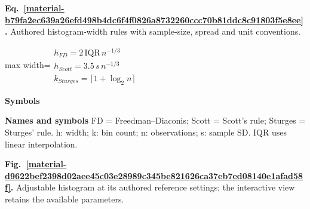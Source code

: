 \documentclass[11pt,a4paper]{article}
\begin{document}
\par\medskip
\begin{samepage}
\label{material-b79fa2ec639a26efd498b4dc6f4f0826a8732260ccc70b81ddc8c91803f5e8ee}
\noindent\textbf{Eq.~\ref*{material-b79fa2ec639a26efd498b4dc6f4f0826a8732260ccc70b81ddc8c91803f5e8ee}.} Authored histogram-width rules with sample-size, spread and unit conventions.\par\nopagebreak
\begin{center}\begin{adjustbox}{max width=\linewidth}$\displaystyle \begin{gathered}h_{FD}=2\,\mathrm{IQR}\,n^{-1/3}\\h_{Scott}=3.5\,s\,n^{-1/3}\\k_{Sturges}=\lceil1+\log_2 n\rceil\end{gathered}$\end{adjustbox}\end{center}

\par\noindent\textbf{Symbols}

\par\noindent\textbf{Names and symbols} FD = Freedman–Diaconis; Scott = Scott's rule; Sturges = Sturges' rule. h: width; k: bin count; n: observations; s: sample SD. IQR uses linear interpolation.

\end{samepage}
\medskip

\par\medskip
\Needspace{10cm}
\label{material-d9622bef2398d02aee45c03e28989c345be821626ca37eb7ed08140e1afad58f}
\noindent\textbf{Fig.~\ref*{material-d9622bef2398d02aee45c03e28989c345be821626ca37eb7ed08140e1afad58f}.} Adjustable histogram at its authored reference settings; the interactive view retains the available parameters.\par\nopagebreak
\begin{center}
\end{center}
\end{document}
